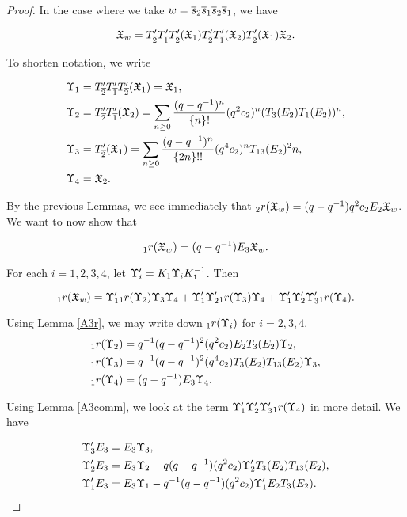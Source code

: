 \documentclass[a4 paper, 10pt]{article}
\begin{document}
\begin{proof}
In the case where we take $w = \overline{s}_{2}\overline{s}_{1}\overline{s}_{2}\overline{s}_{1}$, we have

\begin{equation*}
 \mathfrak{X}_w = T^{\prime}_{\overline{2}}T^{\prime}_{\overline{1}}T^{\prime}_{\overline{2}}(\mathfrak{X}_1) T^{\prime}_{\overline{2}}T^{\prime}_{\overline{1}}(\mathfrak{X}_2) T^{\prime}_{\overline{2}}(\mathfrak{X}_1) \mathfrak{X}_2.
\end{equation*}

To shorten notation, we write

\begin{align*}
\Upsilon_1 &= T^{\prime}_{\overline{2}}T^{\prime}_{\overline{1}}T^{\prime}_{\overline{2}}(\mathfrak{X}_1) = \mathfrak{X}_1, \\
\Upsilon_2 &= T^{\prime}_{\overline{2}}T^{\prime}_{\overline{1}}(\mathfrak{X}_2) = \sum_{n \geq 0} \dfrac{(q-q^{-1})^n}{ \{n \}! } (q^2c_2)^n (T_3(E_2)T_1(E_2))^n,\\
\Upsilon_3 &= T^{\prime}_{\overline{2}}(\mathfrak{X}_1) = \sum_{n \geq 0} \dfrac{(q-q^{-1})^n}{ \{2n \}!!} (q^4c_2)^n T_{13}(E_2)^2n,\\
\Upsilon_4 &= \mathfrak{X}_2.  
\end{align*}

\noindent By the previous Lemmas, we see immediately that ${}_{2}r(\mathfrak{X}_w) = (q-q^{-1})q^2c_2E_2\mathfrak{X}_w$. We want to now show that

\begin{equation*}
{}_{1}r(\mathfrak{X}_w) = (q-q^{-1})E_3\mathfrak{X}_w.
\end{equation*}

\noindent For each $i = 1, 2, 3, 4$, let $\Upsilon_i^{\prime} = K_1\Upsilon_iK_1^{-1}$. Then

\begin{equation*}
{}_{1}r(\mathfrak{X}_w) = \Upsilon_1^{\prime} {}_{1}r(\Upsilon_2) \Upsilon_3\Upsilon_4 + \Upsilon_1^{\prime}\Upsilon_2^{\prime} {}_{1}r(\Upsilon_3) \Upsilon_4 + \Upsilon_1^{\prime}\Upsilon_2^{\prime}\Upsilon_3^{\prime} {}_{1}r(\Upsilon_4).
\end{equation*}

\noindent Using Lemma \ref{A3r}, we may write down ${}_{1}r(\Upsilon_i)$ for $i = 2,3,4$.
\begin{align*}
{}_{1}r(\Upsilon_2)	&=	q^{-1}(q-q^{-1})^2(q^2c_2)E_2T_3(E_2)\Upsilon_2,\\
{}_{1}r(\Upsilon_3)	&=	q^{-1}(q-q^{-1})^2(q^4c_2)T_3(E_2)T_{13}(E_2)\Upsilon_3,\\
{}_{1}r(\Upsilon_4)&=	(q-q^{-1})E_3\Upsilon_4.	
\end{align*}
 
\noindent Using Lemma \ref{A3comm}, we look at the term $\Upsilon_1^{\prime}\Upsilon_2^{\prime}\Upsilon_3^{\prime} {}_{1}r(\Upsilon_4)$ in more detail. We have

\begin{align*}
\Upsilon_3^{\prime}E_3	&=	E_3\Upsilon_3, \\
\Upsilon_2^{\prime}E_3	&=	E_3\Upsilon_2 - q(q-q^{-1})(q^2c_2)\Upsilon_2^{\prime}T_3(E_2)T_{13}(E_2),\\
\Upsilon_1^{\prime}E_3	&=	E_3\Upsilon_1 - q^{-1}(q-q^{-1})(q^2c_2)\Upsilon_{1}^{\prime}E_2T_3(E_2).
\end{align*}


\end{proof}
\end{document}

